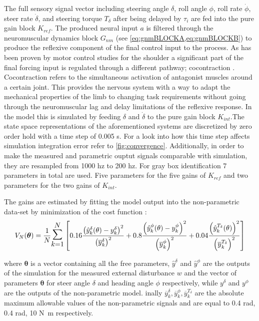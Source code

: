 The full sensory signal vector including steering angle \ensuremath{\delta}, roll angle \ensuremath{\phi}, roll rate \ensuremath{\dot{\phi}}, steer rate \ensuremath{\dot{\delta}}, and steering torque \ensuremath{T_\delta} after being delayed by \ensuremath{\tau_i} are fed into the pure gain block \ensuremath{K_{ref}}. The produced neural input \ensuremath{a} is filtered through the neuromuscular dynamics block \ensuremath{G_{nm}} (see \cref{eq:gnmBLOCKA,eq:gnmBLOCKB}) to produce the reflexive component of the final control input to the process. As has been proven by motor control studies for the shoulder a significant part of the final forcing input is regulated through a different pathway; cocontraction \cite{schouten2008nmclab} . Cocontraction refers to the  simultaneous activation of antagonist muscles around a certain joint. This  provides the nervous system with a way to adapt the mechanical properties of the limb to changing task requirements without going through the neuromuscular lag and delay limitations of the reflexive response. In the model this is simulated by feeding \ensuremath{\delta} and \ensuremath{\dot{\delta}} to the pure gain block \ensuremath{K_{int}}.The state space representations of the aforementioned systems are discretized by zero order hold with a time step of 0.005 \si{\second}. For a look into how this time step affects simulation integration error refer to \cref{fig:convergence}. Additionally, in order to make the measured  and parametric ouptut signals comparable with simulation, they are resampled from 1000 \si{hz} to 200 \si{hz}.  For gray box identification 7 parameters in total are used. Five parameters for the five gains of \ensuremath{K_{ref}} and two parameters for the two gains of \ensuremath{K_{int}}.




The gains are estimated by fitting the model output into the non-parametric data-set by minimization of the cost function :
\begin{equation}
    V_{N}(\boldsymbol{\theta})=\frac{1}{N} \mathlarger{\mathlarger{\mathlarger{\sum}}}_{k=1}^{N}\left[0.16\frac{\left(\hat{y}^{\delta}_k(\mathbf{\theta})-y^\delta_k\right)^{2}}{\left(\overline{y}^{\delta}_k\right)^2}+0.8\frac{\left(\hat{y}^{\phi}_k(\mathbf{\theta})-y^\phi_k\right)^{2}}{\left(\overline{y}^{\phi}_k\right)^2}+0.04\frac{\left(\hat{y}^{T_\delta}_k(\mathbf{\theta})\right)^2}{\left(\overline{y}^{T_\delta}_k\right)^2}\right]
    \label{eq:cost2}
    \end{equation}


where \ensuremath{\boldsymbol{\theta}} is a vector containing all the free parameters, \ensuremath{\hat{y}^{\delta}} and \ensuremath{\hat{y}^{\phi}} are the outputs of the simulation for the measured external disturbance \ensuremath{w} and the vector of parameters  \ensuremath{\boldsymbol{\theta}} for steer angle \ensuremath{\delta} and heading angle \ensuremath{\phi}  respectively, while \ensuremath{y^\delta} and \ensuremath{y^\phi} are the outputs of the non-parametric model. inally \ensuremath{\overline{y}^{\delta}_k,\overline{y}^{\phi}_k,\overline{y}^{T_\delta}_k} are the absolute maximum allowable values of the non-parametric signals and are equal to 0.4 \si{\radian}, 0.4 \si{\radian}, 10 \si{N.m} respectively.

